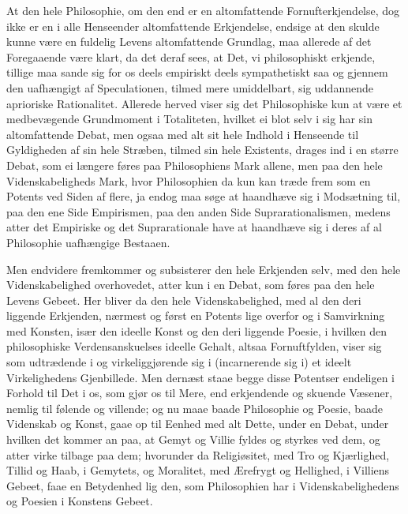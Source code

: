 \documentclass[12pt,a4paper]{book}
\newcommand{\apage}[1]{\marginnote{\footnotesize\textit{[#1]}}}
\begin{document}
At den hele Philosophie, om den end er en altomfattende Fornufterkjendelse, dog ikke
er en i alle Henseender altomfattende Erkjendelse, endsige at den skulde kunne være
en fuldelig Levens altomfattende Grundlag, maa allerede af det Foregaaende være
klart, da det deraf sees, at Det, vi philosophiskt erkjende, tillige maa sande sig
for os deels empiriskt deels sympathetiskt saa og gjennem den uafhængigt af
Speculationen, tilmed mere umiddelbart, sig uddannende aprioriske Rationalitet.
Allerede herved viser sig det Philosophiske kun at være et medbevægende Grundmoment
i Totaliteten, hvilket ei blot selv i sig har sin altomfattende Debat, men ogsaa med
alt sit hele Indhold i Henseende til Gyldigheden af sin hele Stræben, tilmed sin hele
Existents, drages ind i en større Debat, som ei længere føres paa Philosophiens Mark
allene, men paa den hele Videnskabeligheds Mark, hvor Philosophien da kun kan træde
frem som en Potents ved Siden af flere, ja endog maa søge at haandhæve sig i
Modsætning til, paa den ene Side Empirismen, paa den anden Side Suprarationalismen,
medens atter det Empiriske og det Suprarationale have at haandhæve sig i deres af al
Philosophie uafhængige Bestaaen.

Men endvidere fremkommer og subsisterer den hele Erkjenden selv, med den hele
Videnskabelighed overhovedet, \apage{83}  atter kun i en Debat, som føres paa den hele Levens
Gebeet. Her bliver da den hele Videnskabelighed, med al den deri liggende Erkjenden,
nærmest og først en Potents lige overfor og i Samvirkning med Konsten, især den
ideelle Konst og den deri liggende Poesie, i hvilken den philosophiske
Verdensanskuelses ideelle Gehalt, altsaa Fornuftfylden, viser sig som udtrædende i og
virkeliggjørende sig i (incarnerende sig i) et ideelt Virkelighedens Gjenbillede.
Men dernæst staae begge disse Potentser endeligen i Forhold til Det i os, som gjør os
til Mere, end erkjendende og skuende Væsener, nemlig til følende og villende; og nu
maae baade Philosophie og Poesie, baade Videnskab og Konst, gaae op til Eenhed med
alt Dette, under en Debat, under hvilken det kommer an paa, at Gemyt og Villie fyldes
og styrkes ved dem, og atter virke tilbage paa dem; hvorunder da Religiøsitet, med
Tro og Kjærlighed, Tillid og Haab, i Gemytets, og Moralitet, med Ærefrygt og
Hellighed, i Villiens Gebeet, faae en Betydenhed lig den, som Philosophien har i
Videnskabelighedens og Poesien i Konstens Gebeet.
\end{document}
